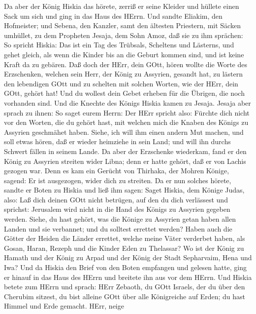  Da aber der König Hiskia das hörete, zerriß er seine
Kleider und hüllete einen Sack um sich und ging in das Haus des HErrn.
 Und sandte Eliakim, den Hofmeister; und Sebena, den
Kanzler, samt den ältesten Priestern, mit Säcken umhüllet, zu dem
Propheten Jesaja, dem Sohn Amoz,  daß sie zu ihm sprächen:
So spricht Hiskia: Das ist ein Tag des Trübsals, Scheltens und Lästerns,
und gehet gleich, als wenn die Kinder bis an die Geburt kommen sind, und
ist keine Kraft da zu gebären.  Daß doch der HErr, dein
GOtt, hören wollte die Worte des Erzschenken, welchen sein Herr, der
König zu Assyrien, gesandt hat, zu lästern den lebendigen GOtt und zu
schelten mit solchen Worten, wie der HErr, dein GOtt, gehört hat! Und du
wollest dein Gebet erheben für die Übrigen, die noch vorhanden sind.
 Und die Knechte des Königs Hiskia kamen zu Jesaja.
 Jesaja aber sprach zu ihnen: So saget eurem Herrn: Der HErr
spricht also: Fürchte dich nicht vor den Worten, die du gehört hast, mit
welchen mich die Knaben des Königs zu Assyrien geschmähet haben.
 Siehe, ich will ihm einen andern Mut machen, und soll etwas
hören, daß er wieder heimziehe in sein Land; und will ihn durchs Schwert
fällen in seinem Lande.  Da aber der Erzschenke wiederkam,
fand er den König zu Assyrien streiten wider Libna; denn er hatte
gehört, daß er von Lachis gezogen war.  Denn es kam ein
Gerücht von Thirhaka, der Mohren Könige, sagend: Er ist ausgezogen,
wider dich zu streiten.  Da er nun solches hörete, sandte
er Boten zu Hiskia und ließ ihm sagen: Saget Hiskia, dem Könige Judas,
also: Laß dich deinen GOtt nicht betrügen, auf den du dich verlässest
und sprichst: Jerusalem wird nicht in die Hand des Königs zu Assyrien
gegeben werden.  Siehe, du hast gehört, was die Könige zu
Assyrien getan haben allen Landen und sie verbannet; und du solltest
errettet werden?  Haben auch die Götter der Heiden die
Länder errettet, welche meine Väter verderbet haben, als Gosan, Haran,
Rezeph und die Kinder Eden zu Thelassar?  Wo ist der König
zu Hamath und der König zu Arpad und der König der Stadt Sepharvaim,
Hena und Iwa?  Und da Hiskia den Brief von den Boten
empfangen und gelesen hatte, ging er hinauf in das Haus des HErrn und
breitete ihn aus vor dem HErrn.  Und Hiskia betete zum
HErrn und sprach:  HErr Zebaoth, du GOtt Israels, der du
über den Cherubim sitzest, du bist alleine GOtt über alle Königreiche
auf Erden; du hast Himmel und Erde gemacht.  HErr, neige
